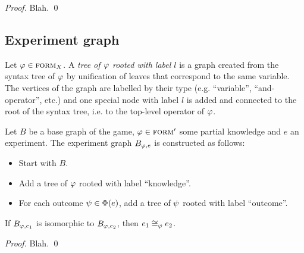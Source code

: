 \begin{proof}
Blah. \qed
\end{proof}

\subsection{Experiment graph}

Let $\varphi\in\textsc{form}_X$.
A \emph{tree of $\varphi$ rooted with label $l$}
  is a graph created from the syntax tree of $\varphi$
  by unification of leaves that correspond to the same variable.
The vertices of the graph are labelled by their type (e.g. ``variable'', ``and-operator'', etc.)
and one special node with label $l$ is added and connected to the root of the syntax tree,
  i.e. to the top-level operator of $\varphi$.

Let $B$ be a base graph of the game, $\varphi\in{\textsc{form}'}$ some partial knowledge
  and $e$ an experiment.
The experiment graph $B_{\varphi, e}$ is constructed as follows:
\begin{itemize}
\item Start with $B$.
\item Add a tree of $\varphi$ rooted with label ``knowledge''.
\item For each outcome $\psi\in\Phi(e)$, add a tree of $\psi$ rooted with label ``outcome''.
\end{itemize}

\begin{theorem}
If $B_{\varphi, e_1}$ is isomorphic to $B_{\varphi, e_2}$, then
 $e_1 \cong_{\varphi} e_2$.
\end{theorem}

\begin{proof}
Blah. \qed
\end{proof}


